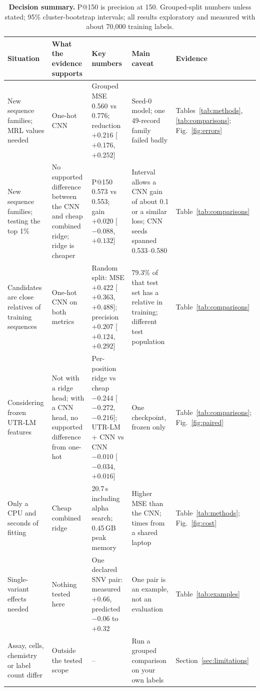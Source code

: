 \documentclass[11pt]{article}
\begin{document}
\begin{table}[H]
\centering
\scriptsize
\caption{\textbf{Decision summary.} P@150 is precision at 150. Grouped-split numbers unless stated; 95\%
cluster-bootstrap intervals; all results exploratory and measured with about 70,000 training labels.}
\label{tab:decision}
\begin{tabularx}{\linewidth}{@{}>{\raggedright\arraybackslash}p{2.6cm} L L L l@{}}
\toprule
Situation & What the evidence supports & Key numbers & Main caveat & Evidence \\
\midrule
New sequence families; MRL values needed & One-hot CNN & Grouped MSE 0.560 vs 0.776; reduction $+0.216$ [$+0.176$, $+0.252$] & Seed-0 model; one 49-record family failed badly & Tables~\ref{tab:methods}, \ref{tab:comparisons}; Fig.~\ref{fig:errors} \\
New sequence families; testing the top 1\% & No supported difference between the CNN and cheap combined ridge; ridge is cheaper & P@150 0.573 vs 0.553; gain $+0.020$ [$-0.088$, $+0.132$] & Interval allows a CNN gain of about 0.1 or a similar loss; CNN seeds spanned 0.533--0.580 & Table~\ref{tab:comparisons} \\
Candidates are close relatives of training sequences & One-hot CNN on both metrics & Random split: MSE $+0.422$ [$+0.363$, $+0.488$]; precision $+0.207$ [$+0.124$, $+0.292$] & 79.3\% of that test set has a relative in training; different test population & Table~\ref{tab:comparisons} \\
Considering frozen UTR-LM features & Not with a ridge head; with a CNN head, no supported difference from one-hot & Per-position ridge vs cheap $-0.244$ [$-0.272$, $-0.216$]; UTR-LM + CNN vs CNN $-0.010$ [$-0.034$, $+0.016$] & One checkpoint, frozen only & Table~\ref{tab:comparisons}; Fig.~\ref{fig:paired} \\
Only a CPU and seconds of fitting & Cheap combined ridge & 20.7\,s including alpha search; 0.45\,GB peak memory & Higher MSE than the CNN; times from a shared laptop & Table~\ref{tab:methods}; Fig.~\ref{fig:cost} \\
Single-variant effects needed & Nothing tested here & One declared SNV pair: measured $+0.66$, predicted $-0.06$ to $+0.32$ & One pair is an example, not an evaluation & Table~\ref{tab:examples} \\
Assay, cells, chemistry or label count differ & Outside the tested scope & -- & Run a grouped comparison on your own labels & Section~\ref{sec:limitations} \\
\bottomrule
\end{tabularx}
\end{table}
\end{document}
